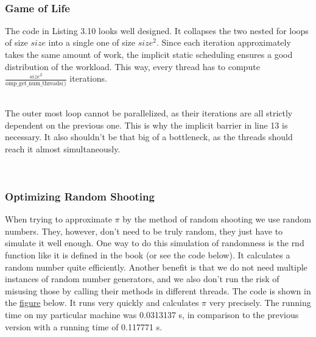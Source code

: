 \documentclass[../../main.tex]{subfiles}
\begin{document}
~\\
\subsubsection{Game of Life}
The code in Listing 3.10 looks well designed.
It collapses the two nested for loops of size $size$ into a single one of size $size^2$.
Since each iteration approximately takes the same amount of work, the implicit static scheduling ensures a good distribution of the workload.
This way, every thread has to compute \( \frac{size^2}{\text{omp\_get\_num\_threads()}} \) iterations.

~\\
The outer most loop cannot be parallelized, as their iterations are all strictly dependent on the previous one.
This is why the implicit barrier in line 13 is necessary.
It also shouldn't be that big of a bottleneck, as the threads should reach it almost simultaneously.


~\\
\subsubsection{Optimizing Random Shooting}
When trying to approximate $\pi$ by the method of random shooting we use random numbers.
They, however, don't need to be truly random, they just have to simulate it well enough.
One way to do this simulation of randomness is the rnd function like it is defined in the book (or see the code below).
It calculates a random number quite efficiently.
Another benefit is that we do not need multiple instances of random number generators, and we also don't run the risk of misusing those by calling their methods in different threads.
The code is shown in the \hyperref[fig:calculate_pi_v2]{figure} below.
It runs very quickly and calculates $\pi$ very precisely.
The running time on my particular machine was 0.0313137 s, in comparison to the previous version with a running time of 0.117771 s.
\end{document}
